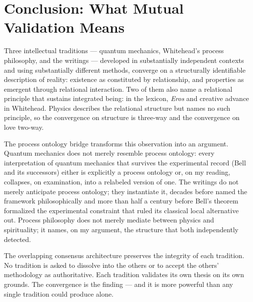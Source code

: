 
\section{Conclusion: What Mutual Validation Means}
\label{sec:conclusion}


Three intellectual traditions --- quantum mechanics, Whitehead's process
philosophy, and the \bahai writings --- developed in substantially
independent contexts and using substantially different methods, converge
on a structurally identifiable description of reality: existence as
constituted by relationship, and properties as emergent through relational
interaction.
Two of them also name a relational principle that sustains integrated
being: \mahabbat in the \bahai lexicon, \emph{Eros} and creative advance
in Whitehead.
Physics describes the relational structure but names no such principle,
so the convergence on structure is three-way and the convergence on love
two-way.

The process ontology bridge transforms this observation into an argument.
Quantum mechanics does not merely resemble process ontology: every
interpretation of quantum mechanics that survives the experimental
record (Bell~\citeyear{Bell1964} and its successors) either is
explicitly a process ontology or, on my reading, collapses, on examination,
into a relabeled version of one.
The \bahai writings do not merely anticipate process ontology; they
instantiate it, decades before \citet{Whitehead1929} named the framework
philosophically and more than half a century before Bell's theorem
formalized the experimental constraint that ruled its classical local
alternative out.
Process philosophy does not merely mediate between physics and spirituality;
it names, on my argument, the structure that both
independently detected.

The overlapping consensus architecture preserves the integrity of each tradition.
No tradition is asked to dissolve into the others or to accept the others'
methodology as authoritative.
Each tradition validates its own thesis on its own grounds.
The convergence is the finding --- and it is more powerful than any single tradition
could produce alone.

